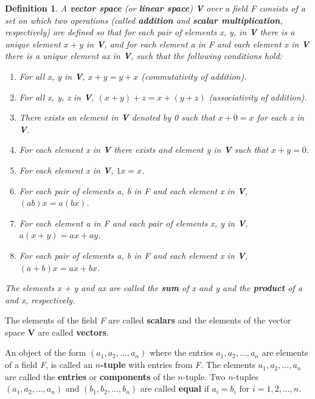 \documentclass{article}
\newtheorem*{definition}{Definition}
\begin{document}
\begin{definition}
	A \textbf{vector space} (or \textbf{linear space}) \textbf{\textup{V}} over a field F consists of a set on which two operations (called \textbf{addition} and \textbf{scalar multiplication}, respectively) are defined so that for each pair of elements x, y, in \textbf{\textup{V}} there is a unique element $x + y$ in \textbf{\textup{V}}, and for each element a in F and each element x in \textbf{\textup{V}} there is a unique element ax in \textbf{\textup{V}}, such that the following conditions hold:
	\begin{enumerate}
		\setlength{\itemindent}{.3in}
		\item[(VS 1)] For all x, y in \textbf{\textup{V}}, $x + y = y + x$ (commutativity of addition).
		\item[(VS 2)] For all x, y, z in \textbf{\textup{V}}, $(x + y) + z = x + (y + z)$ (associativity of addition).
		\item[(VS 3)] There exists an element in \textbf{\textup{V}} denoted by 0 such that $x + \textit{0} = x$ for each x in \textbf{\textup{V}}.
		\item[(VS 4)] For each element x in \textbf{\textup{V}} there exists and element y in \textbf{\textup{V}} such that $x + y = \textit{0}$.
		\item[(VS 5)] For each element x in \textbf{\textup{V}}, $1x = x$.
		\item[(VS 6)] For each pair of elements a, b in F and each element x in \textbf{\textup{V}}, $(ab)x = a(bx)$.
		\item[(VS 7)] For each element a in F and each pair of elements x, y in \textbf{\textup{V}}, $a(x + y) = ax + ay$.
		\item[(VS 8)] For each pair of elements a, b in F and each element x in \textbf{\textup{V}}, $(a + b)x = ax + bx$.
	\end{enumerate}
	The elements x + y and ax are called the \textbf{sum} of x and y and the \textbf{product} of a and x, respectively.
\end{definition}

The elements of the field \textit{F} are called \textbf{scalars} and the elements of the vector space \textbf{V} are called \textbf{vectors}.

An object of the form $(a_1, a_2, ..., a_n)$ where the entries $a_1, a_2, ..., a_n$ are elements of a field \textit{F}, is called an \textbf{$n$-tuple} with entries from \textit{F}. The elements $a_1, a_2, ..., a_n$ are called the \textbf{entries} or \textbf{components} of the $n$-tuple. Two $n$-tuples $(a_1, a_2, ..., a_n)$ and $(b_1, b_2, ..., b_n)$ are called \textbf{equal} if $a_i = b_i$ for $i = 1, 2, ..., n$.
\end{document}
